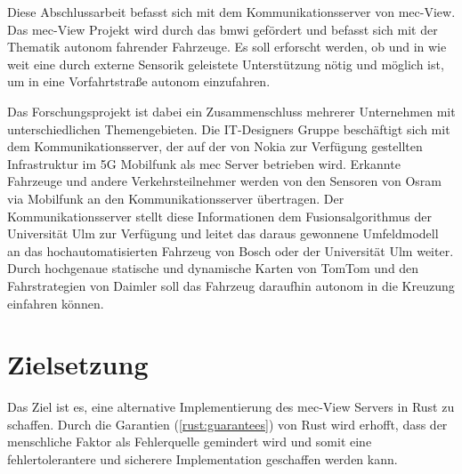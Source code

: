 Diese Abschlussarbeit befasst sich mit dem Kommunikationsserver von \gls{mec}-View.
Das \gls{mec}-View Projekt wird durch das \gls{bmwi} gefördert und befasst sich mit der Thematik autonom fahrender Fahrzeuge.
Es soll erforscht werden, ob und in wie weit eine durch externe Sensorik geleistete Unterstützung nötig und möglich ist, um in eine Vorfahrtstraße autonom einzufahren.

Das Forschungsprojekt ist dabei ein Zusammenschluss mehrerer Unternehmen mit unterschiedlichen Themengebieten.
Die IT-Designers Gruppe beschäftigt sich mit dem Kommunikationsserver, der auf der von Nokia zur Verfügung gestellten Infrastruktur im 5G Mobilfunk als \gls{mec} Server betrieben wird.
Erkannte Fahrzeuge und andere Verkehrsteilnehmer werden von den Sensoren von Osram via Mobilfunk an den Kommunikationsserver übertragen.
Der Kommunikationsserver stellt diese Informationen dem Fusionsalgorithmus der Universität Ulm zur Verfügung und leitet das daraus gewonnene Umfeldmodell an das hochautomatisierten Fahrzeug von Bosch oder der Universität Ulm weiter.
Durch hochgenaue statische und dynamische Karten von TomTom und den Fahrstrategien von Daimler soll das Fahrzeug daraufhin autonom in die Kreuzung einfahren können.




\section{Zielsetzung}

Das Ziel ist es, eine alternative Implementierung des \gls{mec}-View Servers in Rust zu schaffen.
Durch die Garantien (\autoref{rust:guarantees}) von Rust wird erhofft, dass der menschliche Faktor als Fehlerquelle gemindert wird und somit eine fehlertolerantere und sicherere Implementation geschaffen werden kann.

